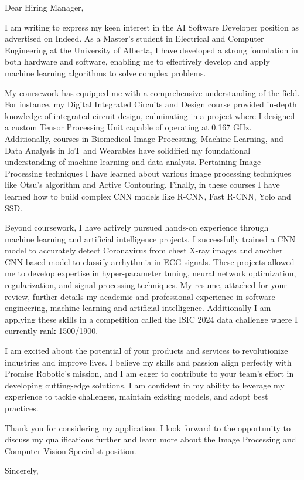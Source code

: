\documentclass[
	parskip=half, %
	enlargefirstpage=true, %
]{scrlttr2} %
\begin{document}

Dear Hiring Manager,

I am writing to express my keen interest in the AI Software Developer position as advertised on Indeed. As a Master's student in Electrical and Computer Engineering at the University of Alberta, I have developed a strong foundation in both hardware and software, enabling me to effectively develop and apply machine learning algorithms to solve complex problems.

My coursework has equipped me with a comprehensive understanding of the field. For instance, my Digital Integrated Circuits and Design course provided in-depth knowledge of integrated circuit design, culminating in a project where I designed a custom Tensor Processing Unit capable of operating at 0.167 GHz. Additionally, courses in Biomedical Image Processing, Machine Learning, and Data Analysis in IoT and Wearables have solidified my foundational understanding of machine learning and data analysis. Pertaining Image Processing techniques I have learned about various image processing techniques like Otsu's algorithm and Active Contouring. Finally, in these courses I have learned how to build complex CNN models like R-CNN, Fast R-CNN, Yolo and SSD.

Beyond coursework, I have actively pursued hands-on experience through machine learning and artificial intelligence projects. I successfully trained a CNN model to accurately detect Coronavirus from chest X-ray images and another CNN-based model to classify arrhythmia in ECG signals. These projects allowed me to develop expertise in hyper-parameter tuning, neural network optimization, regularization, and signal processing techniques. My resume, attached for your review, further details my academic and professional experience in software engineering, machine learning and artificial intelligence. Additionally I am applying these skills in a competition called the ISIC 2024 data challenge where I currently rank 1500/1900. 

I am excited about the potential of your products and services to revolutionize industries and improve lives. I believe my skills and passion align perfectly with Promise Robotic's mission, and I am eager to contribute to your team's effort in developing cutting-edge solutions. I am confident in my ability to leverage my experience to tackle challenges, maintain existing models, and adopt best practices.

Thank you for considering my application. I look forward to the opportunity to discuss my qualifications further and learn more about the Image Processing and Computer Vision Specialist position.   

Sincerely,\\

\end{document}
